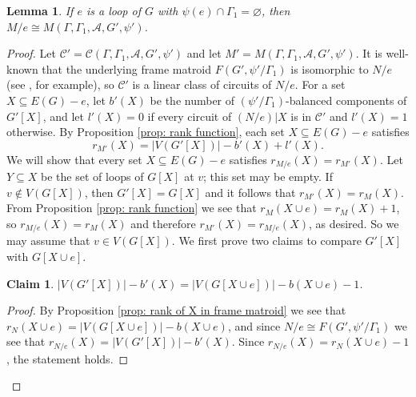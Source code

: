 \documentclass[12pt]{article}
\newtheorem{claim}{Claim}[theorem]
\newtheorem{lemma}[theorem]{Lemma}
\theoremstyle{definition}
\newcommand{\cA}{\mathcal{A}}
\newcommand{\cC}{\mathcal{C}}
\begin{document}
\begin{lemma} \label{lem: contraction of doubly-unbalanced loop}
If $e$ is a loop of $G$ with $\psi(e) \cap \Gamma_1 = \varnothing$, then $M/e \cong M(\Gamma, \Gamma_1, \cA, G', \psi')$.
\end{lemma}
\begin{proof}
Let $\cC' = \cC(\Gamma, \Gamma_1, \cA, G', \psi')$ and let $M' = M(\Gamma, \Gamma_1, \cA, G', \psi')$.
It is well-known that the underlying frame matroid $F(G', \psi'/\Gamma_1)$ is isomorphic to $N/e$ (see \cite[Proposition 2.4]{Funk-Pivotto-Slilaty-2022}, for example), so $\cC'$ is a linear class of circuits of $N/e$.
For a set $X \subseteq E(G) - e$, let $b'(X)$ be the number of $(\psi'/\Gamma_1)$-balanced components of $G'[X]$, and let $l'(X) = 0$ if every circuit of $(N/e)|X$ is in $\cC'$ and $l'(X) = 1$ otherwise.
By Proposition \ref{prop: rank function}, each set $X \subseteq E(G) - e$ satisfies
$$r_{M'}(X) = |V(G'[X])| - b'(X) + l'(X).$$
We will show that every set $X \subseteq E(G) - e$ satisfies $r_{M/e}(X) = r_{M'}(X)$.
Let $Y \subseteq X$ be the set of loops of $G[X]$ at $v$; this set may be empty.
If $v \notin V(G[X])$, then $G'[X] = G[X]$ and it follows that $r_{M'}(X) = r_M(X)$.
From Proposition \ref{prop: rank function} we see that $r_M(X \cup e) = r_M(X) + 1$, so $r_{M/e}(X) = r_M(X)$ and therefore $r_{M'}(X) = r_{M/e}(X)$, as desired.
So we may assume that $v \in V(G[X])$.
We first prove two claims to compare $G'[X]$ with $G[X \cup e]$.

\begin{claim} \label{claim: b-value comparison in loop case}
$|V(G'[X])| - b'(X) = |V(G[X \cup e])| - b(X \cup e) - 1$.
\end{claim}
\begin{proof}
By Proposition \ref{prop: rank of X in frame matroid} we see that $r_N(X \cup e) = |V(G[X \cup e])| - b(X \cup e)$, and since $N/e \cong F(G', \psi'/\Gamma_1)$ we see that $r_{N/e}(X) = |V(G'[X])| - b'(X)$.
Since $r_{N/e}(X) = r_N(X \cup e) - 1$, the statement holds.
\end{proof}



\end{proof}
\end{document}
